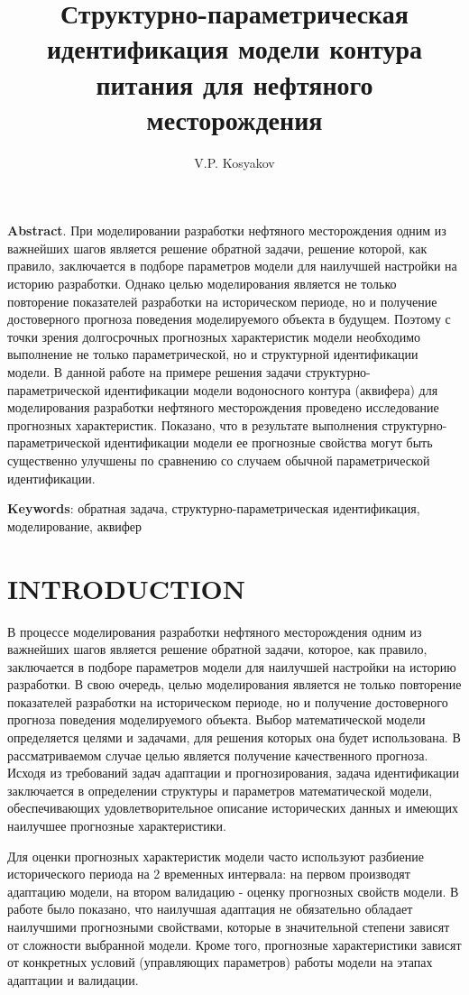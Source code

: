 \documentclass{article}
\title{Структурно-параметрическая идентификация модели контура питания для нефтяного месторождения}
\author{V.P. Kosyakov}
\begin{document}
	\maketitle
	\textbf{Abstract}. При моделировании разработки нефтяного месторождения одним из важнейших шагов является решение обратной задачи, решение которой, как правило, заключается в подборе параметров модели для наилучшей настройки на историю разработки. Однако целью моделирования является не только повторение показателей разработки на историческом периоде, но и получение достоверного прогноза поведения моделируемого объекта в будущем. Поэтому с точки зрения долгосрочных прогнозных характеристик модели необходимо выполнение не только параметрической, но и структурной идентификации модели.
В данной работе на примере решения задачи структурно-параметрической идентификации модели водоносного контура (аквифера) для моделирования разработки нефтяного месторождения проведено исследование прогнозных характеристик. Показано, что в результате выполнения структурно-параметрической идентификации модели ее прогнозные свойства могут быть существенно улучшены по сравнению со случаем обычной параметрической идентификации. 

\textbf{Keywords}: обратная задача, структурно-параметрическая идентификация, моделирование, аквифер
\section{INTRODUCTION}
	В процессе моделирования разработки нефтяного месторождения одним из важнейших шагов является решение обратной задачи, которое, как правило, заключается в подборе параметров модели для наилучшей настройки на историю разработки. В свою очередь, целью моделирования является не только повторение показателей разработки на историческом периоде, но и получение достоверного прогноза поведения моделируемого объекта. Выбор математической модели определяется целями и задачами, для решения которых она будет использована. В рассматриваемом случае целью является получение качественного прогноза. Исходя из требований задач адаптации и прогнозирования, задача идентификации заключается в определении структуры и параметров математической модели, обеспечивающих удовлетворительное описание исторических данных и имеющих наилучшее прогнозные характеристики.
	
	Для оценки прогнозных характеристик модели часто используют разбиение исторического периода на 2 временных интервала: на первом производят адаптацию модели, на втором валидацию - оценку прогнозных свойств модели. В работе \cite{mus} было показано, что наилучшая адаптация не обязательно обладает наилучшими прогнозными свойствами, которые в значительной степени зависят от сложности выбранной модели. Кроме того, прогнозные характеристики зависят от конкретных условий (управляющих параметров) работы модели на этапах адаптации и валидации.
	
\end{document}
